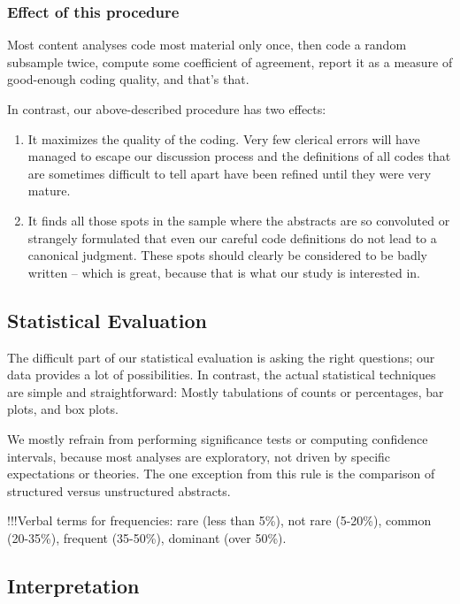 \documentclass[10pt,journal,compsoc]{IEEEtran}
\begin{document}
\subsubsection{Effect of this procedure}

Most content analyses code most material only once, 
then code a random subsample twice, 
compute some coefficient of agreement, 
report it as a measure of good-enough coding quality,
and that's that.

In contrast, our above-described procedure has two effects:
\begin{enumerate}
	\item It maximizes the quality of the coding.
	  Very few clerical errors will have managed to escape our discussion process
	  and the definitions of all codes that are sometimes difficult to tell apart
	  have been refined until they were very mature.
	\item It finds all those spots in the sample where the abstracts are so convoluted
	  or strangely formulated that even our careful code definitions do not lead
	  to a canonical judgment.
	  These spots should clearly be considered to be badly written -- which is great,
	  because that is what our study is interested in.
\end{enumerate}


\subsection{Statistical Evaluation}

The difficult part of our statistical evaluation is asking the right questions;
our data provides a lot of possibilities.
In contrast, the actual statistical techniques are simple and straightforward:
Mostly tabulations of counts or percentages, bar plots, and box plots.

We mostly refrain from performing significance tests or computing confidence intervals,
because most analyses are exploratory, not driven by specific expectations or theories.
The one exception from this rule is the comparison of structured versus unstructured abstracts.

!!!Verbal terms for frequencies: 
rare (less than 5\%),
not rare (5-20\%),
common (20-35\%),
frequent (35-50\%),
dominant (over 50\%).


\subsection{Interpretation}
\end{document}
